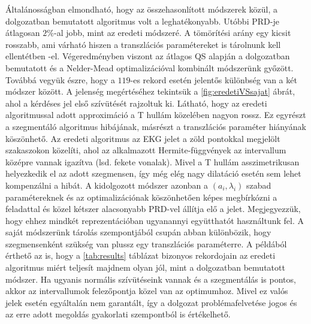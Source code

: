 \documentclass[oneside,titlepage,12pt,a4paper]{report}
\begin{document}
Általánosságban elmondható, hogy az összehasonlított módszerek közül, a dolgozatban bemutatott algoritmus volt a leghatékonyabb. Utóbbi PRD-je átlagosan $2\%$-al jobb, mint az eredeti módszeré. A tömörítési arány egy kicsit rosszabb, ami várható hiszen a transzlációs paramétereket is tárolnunk kell ellentétben \cite{hexp1}-el. Végeredményben viszont az átlagos QS alapján a dolgozatban bemutatott és a Nelder-Mead optimalizációval kombinált módszerünk győzött. Továbbá vegyük észre, hogy a $119$-es rekord esetén jelentős különbség van a két módszer között. A jelenség megértéséhez tekintsük a \ref{fig:eredetiVSsajat} ábrát, ahol a kérdéses jel első szívütését rajzoltuk ki. Látható, hogy az eredeti algoritmussal adott approximáció a T hullám közelében nagyon rossz. Ez egyrészt a szegmentáló algoritmus hibájának, másrészt a transzlációs paraméter hiányának köszönhető. Az eredeti algoritmus az EKG jelet a zöld pontokkal megjelölt szakaszokon közelíti, ahol az alkalmazott Hermite-függvények az intervallum középre vannak igazítva (lsd. fekete vonalak). Mivel a T hullám asszimetrikusan helyezkedik el az adott szegmensen, így még elég nagy dilatáció esetén sem lehet kompenzálni a hibát. A kidolgozott módszer azonban a $(a_i,\lambda_i)$ szabad paramétereknek és az optimalizációnak köszönhetően képes megbírkózni a feladattal és közel kétszer alacsonyabb PRD-vel állítja elő a jelet. Megjegyezzük, hogy ehhez mindkét reprezentációban ugyanannyi együtthatót használtunk fel. A saját módszerünk tárolás szempontjából csupán abban különbözik, hogy szegmensenként szükség van plussz egy transzlációs paraméterre. A példából érthető az is, hogy a \ref{tab:results} táblázat bizonyos rekordojain az eredeti algoritmus miért teljesít majdnem olyan jól, mint a dolgozatban bemutatott módszer. Ha ugyanis normális szívütéseink vannak és a szegmentálás is pontos, akkor az intervallumok felezőpontja közel van az optimumhoz. Mivel ez valós jelek esetén egyáltalán nem garantált, így a dolgozat problémafelvetése jogos és az erre adott megoldás gyakorlati szempontból is értékelhető.
\vspace{5mm} 
\end{document}
